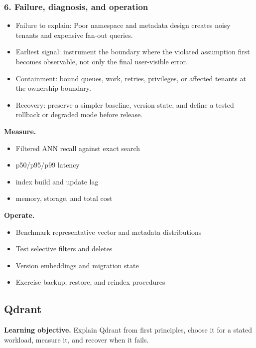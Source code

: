 \subsubsection*{6. Failure, diagnosis, and operation}
\begin{itemize}
\item Failure to explain: Poor namespace and metadata design creates noisy tenants and expensive fan-out queries.
\item Earliest signal: instrument the boundary where the violated assumption first becomes observable, not only the final user-visible error.
\item Containment: bound queues, work, retries, privileges, or affected tenants at the ownership boundary.
\item Recovery: preserve a simpler baseline, version state, and define a tested rollback or degraded mode before release.
\end{itemize}
\textbf{Measure.}\begin{itemize}
\item Filtered ANN recall against exact search
\item p50/p95/p99 latency
\item index build and update lag
\item memory, storage, and total cost
\end{itemize}
\textbf{Operate.}\begin{itemize}
\item Benchmark representative vector and metadata distributions
\item Test selective filters and deletes
\item Version embeddings and migration state
\item Exercise backup, restore, and reindex procedures
\end{itemize}
\subsection{Qdrant}
\textbf{Learning objective.} Explain Qdrant from first principles, choose it for a stated workload, measure it, and recover when it fails.
